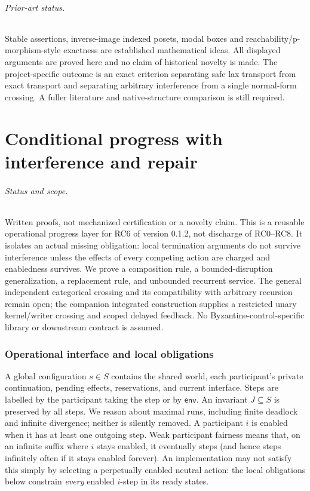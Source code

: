 \documentclass[11pt]{article}
\begin{document}
\paragraph{Prior-art status.} Stable assertions, inverse-image indexed posets, modal boxes and reachability/p-morphism-style exactness are established mathematical ideas. All displayed arguments are proved here and no claim of historical novelty is made. The project-specific outcome is an exact criterion separating safe lax transport from exact transport and separating arbitrary interference from a single normal-form crossing. A fuller literature and native-structure comparison is still required.


\part{Conditional progress with interference and repair}

\paragraph{Status and scope.} Written proofs, not mechanized certification or a novelty claim. This is a reusable operational progress layer for RC6 of version 0.1.2, not discharge of RC0--RC8. It isolates an actual missing obligation: local termination arguments do not survive interference unless the effects of every competing action are charged and enabledness survives. We prove a composition rule, a bounded-disruption generalization, a replacement rule, and unbounded recurrent service. The general independent categorical crossing and its compatibility with arbitrary recursion remain open; the companion integrated construction supplies a restricted unary kernel/writer crossing and scoped delayed feedback. No Byzantine-control-specific library or downstream contract is assumed.

\section{Operational interface and local obligations}
A global configuration $s\in S$ contains the shared world, each participant's private continuation, pending effects, reservations, and current interface. Steps are labelled by the participant taking the step or by $\mathsf{env}$. An invariant $J\subseteq S$ is preserved by all steps. We reason about maximal runs, including finite deadlock and infinite divergence; neither is silently removed. A participant $i$ is enabled when it has at least one outgoing step. Weak participant fairness means that, on an infinite suffix where $i$ stays enabled, it eventually steps (and hence steps infinitely often if it stays enabled forever). An implementation may not satisfy this simply by selecting a perpetually enabled neutral action: the local obligations below constrain \emph{every} enabled $i$-step in its ready states.
\end{document}
